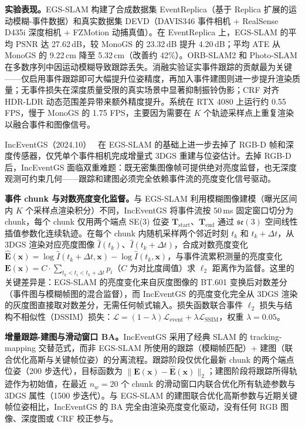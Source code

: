 \textbf{实验表现。}EGS-SLAM 构建了合成数据集 EventReplica（基于 Replica 扩展的运动模糊-事件数据）和真实数据集 DEVD（DAVIS346 事件相机 + RealSense D435i 深度相机 + FZMotion 动捕真值）。在 EventReplica 上，EGS-SLAM 的平均 PSNR 达 27.62\,dB，较 MonoGS 的 23.32\,dB 提升 4.20\,dB；平均 ATE 从 MonoGS 的 9.22\,cm 降至 5.32\,cm（改善约 42\%）。ORB-SLAM2 和 Photo-SLAM 在多数序列中因运动模糊导致跟踪丢失。消融实验证实事件跟踪的贡献最为关键——仅启用事件跟踪即可大幅提升位姿精度，再加入事件建图则进一步提升渲染质量；无事件损失在深度质量受限的真实场景中显著抑制振铃伪影；CRF 对齐 HDR-LDR 动态范围差异带来额外精度提升。系统在 RTX 4080 上运行约 0.55 FPS，慢于 MonoGS 的 1.75 FPS，主要因为需要在 $K$ 个轨迹采样点上重复渲染以融合事件和图像信号。

IncEventGS（2024.10）~\cite{2410_08107} 在 EGS-SLAM 的基础上进一步去掉了 RGB-D 帧和深度传感器，仅凭单个事件相机完成增量式 3DGS 重建与位姿估计。去掉 RGB-D 后，IncEventGS 面临双重难题：既无密集图像帧可提供绝对亮度监督，也无深度观测可约束几何——跟踪和建图必须完全依赖事件流的亮度变化信号驱动。

\textbf{事件 chunk 与对数亮度变化监督。}与 EGS-SLAM 利用模糊图像建模（曝光区间内 $K$ 个采样点渲染积分）不同，IncEventGS 将事件流按 50\,ms 固定窗口切分为 chunk，每个 chunk 仅用两个端点 SE(3) 位姿 $\mathbf{T}_\text{start}$、$\mathbf{T}_\text{end}$ 通过 $\mathfrak{se}(3)$ 空间线性插值参数化连续轨迹。在每个 chunk 内随机采样两个邻近时刻 $t_k$ 和 $t_k{+}\Delta t$，从 3DGS 渲染对应亮度图像 $\hat{I}(t_k)$、$\hat{I}(t_k{+}\Delta t)$，合成对数亮度变化 $\hat{\mathbf{E}}(\mathbf{x}) = \log \hat{I}(t_k{+}\Delta t, \mathbf{x}) - \log \hat{I}(t_k, \mathbf{x})$，与事件流累积测量的亮度变化 $\mathbf{E}(\mathbf{x}) = C \cdot \sum_{t_k < t_i < t_k{+}\Delta t} p_i$（$C$ 为对比度阈值）求 $\ell_2$ 距离作为监督。这里的关键差异是：EGS-SLAM 的亮度变化来自灰度图像的 BT.601 变换后对数差分（事件图与模糊帧图的混合监督），而 IncEventGS 的亮度变化完全从 3DGS 渲染的灰度图直接取对数差分，无需任何帧式输入。损失函数联合事件 $\ell_2$ 损失与结构不相似性（DSSIM）损失：$\mathcal{L} = (1{-}\lambda)\mathcal{L}_\text{event} + \lambda \mathcal{L}_\text{SSIM}$，权重 $\lambda{=}0.05$。

\textbf{增量跟踪-建图与滑动窗口 BA。}IncEventGS 采用了经典 SLAM 的 tracking-mapping 交替范式，而非 EGS-SLAM 所使用的跟踪（模糊帧匹配）+ 建图（联合优化高斯与关键帧位姿）的分离流程。跟踪阶段仅优化最新 chunk 的两个端点位姿（200 步迭代），目标函数为 $\|\mathbf{E}(\mathbf{x}) - \hat{\mathbf{E}}(\mathbf{x})\|_2$；建图阶段将跟踪所得轨迹作为初始值，在最近 $n_w{=}20$ 个 chunk 的滑动窗口内联合优化所有轨迹参数与 3DGS 属性（1500 步迭代）。与 EGS-SLAM 的建图联合优化高斯参数与近期关键帧位姿相比，IncEventGS 的 BA 完全由渲染亮度变化驱动，没有任何 RGB 图像、深度图或 CRF 校正参与。

